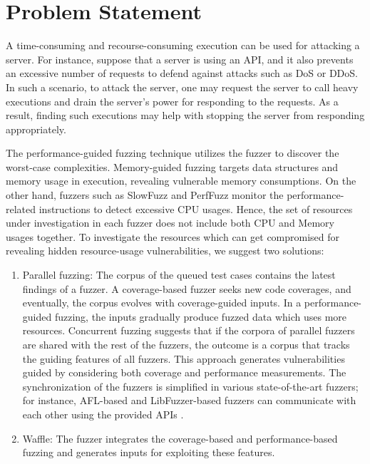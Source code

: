 \section{Problem Statement}

A time-consuming and recourse-consuming execution can be used for attacking a server. For instance, suppose that a server is using an API, and it also prevents an excessive number of requests to defend against attacks such as DoS or DDoS. In such a scenario, to attack the server, one may request the server to call heavy executions and drain the server's power for responding to the requests. As a result, finding such executions may help with stopping the server from responding appropriately.

The performance-guided fuzzing technique utilizes the fuzzer to discover the worst-case complexities. Memory-guided fuzzing targets data structures and memory usage in execution, revealing vulnerable memory consumptions. On the other hand, fuzzers such as SlowFuzz and PerfFuzz monitor the performance-related instructions to detect excessive CPU usages. Hence, the set of resources under investigation in each fuzzer does not include both CPU and Memory usages together. To investigate the resources which can get compromised for revealing hidden resource-usage vulnerabilities, we suggest two solutions:

\begin{enumerate}
    \item Parallel fuzzing: The corpus of the queued test cases contains the latest findings of a fuzzer. A coverage-based fuzzer seeks new code coverages, and eventually, the corpus evolves with coverage-guided inputs. In a performance-guided fuzzing, the inputs gradually produce fuzzed data which uses more resources. Concurrent fuzzing suggests that if the corpora of parallel fuzzers are shared with the rest of the fuzzers, the outcome is a corpus that tracks the guiding features of all fuzzers. This approach generates vulnerabilities guided by considering both coverage and performance measurements. The synchronization of the fuzzers is simplified in various state-of-the-art fuzzers; for instance, AFL-based and LibFuzzer-based fuzzers can communicate with each other using the provided APIs \cite{afl_par}.
    
    \item Waffle: The fuzzer integrates the coverage-based and performance-based fuzzing and generates inputs for exploiting these features.
\end{enumerate}
